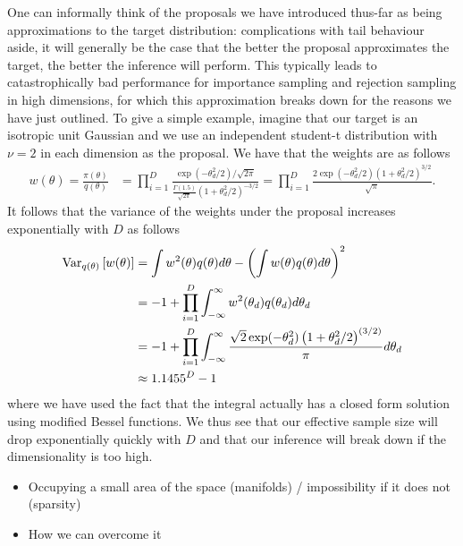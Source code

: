 One can informally think of the proposals we have introduced thus-far as being
approximations to the target distribution: complications with tail behaviour aside, it will
generally be the case that the better the proposal approximates the target, the better the
inference will perform.  This typically leads to catastrophically bad performance for
importance sampling and rejection sampling in high dimensions, for which this approximation
breaks down for the reasons we have just outlined.  To give a simple example, imagine that
our target is an isotropic unit Gaussian and we use an independent student-t distribution
with $\nu=2$ in each dimension as the proposal.  We have that the weights are as follows
\begin{align}
w(\theta) = \frac{\pi(\theta)}{q(\theta)} &= \prod_{i=1}^{D} \frac{\exp(-\theta_d^2/2)/\sqrt{2\pi}}
{\frac{\Gamma(1.5)}{\sqrt{2\pi}}\left(1+\theta_d^2/2\right)^{-3/2} } =\prod_{i=1}^{D} \frac{2 \exp(-\theta_d^2/2) \left(1+\theta_d^2/2\right)^{3/2}}{\sqrt{\pi}}.
\end{align}
It follows that the variance of the weights under the proposal increases exponentially
with $D$ as follows
\begin{align}
\mathrm{Var}_{q(\theta)} \left[w(\theta)\right] &= \int w^2(\theta)q(\theta)d\theta -
\left(\int w(\theta)q(\theta)d\theta\right)^2 \nonumber\\
&=-1+ \prod_{i=1}^{D} \int_{-\infty}^{\infty} w^2(\theta_d)q(\theta_d)d\theta_d \nonumber\\
&=-1+\prod_{i=1}^{D} \int_{-\infty}^{\infty} \frac{\sqrt{2}\exp(-\theta_d^2)\left(1+\theta^2_d/2\right)^{(3/2)}}
{\pi}d\theta_d \nonumber \\
&\approx 1.1455^D-1
\end{align}
where we have used the fact that the integral actually has a closed form solution
using modified Bessel functions.  We thus see that our effective sample size
will drop exponentially quickly with $D$ and that our inference will break down if
the dimensionality is too high.

\begin{itemize}
	\item Occupying a small area of the space (manifolds) / impossibility if it does not (sparsity)
	\item How we can overcome it
\end{itemize}